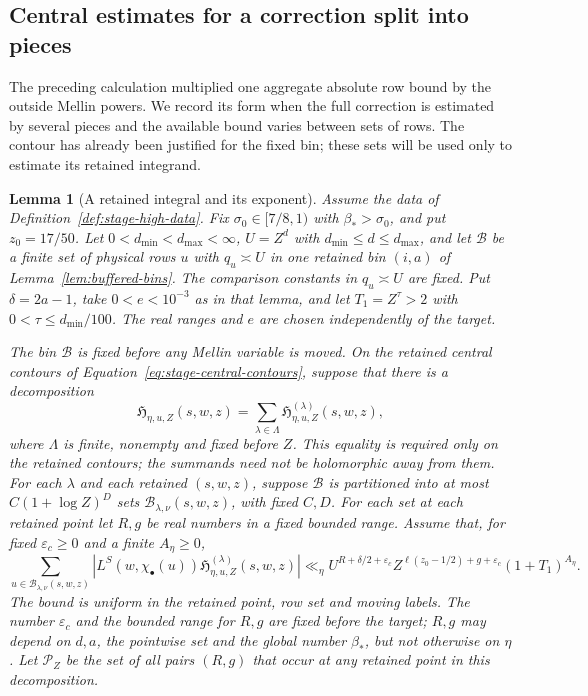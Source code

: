 \documentclass[11pt,a4paper]{article}
\numberwithin{equation}{section}
\numberwithin{figure}{section}
\newtheorem{lemma}[theorem]{Lemma}
\theoremstyle{definition}
\theoremstyle{remark}
\begin{document}
\subsection{Central estimates for a correction split into pieces}

The preceding calculation multiplied one aggregate absolute row bound by
the outside Mellin powers.  We record its form when the full correction is
estimated by several pieces and the available bound varies between sets of
rows.  The contour has already been justified for the fixed bin; these sets
will be used only to estimate its retained integrand.

\begin{lemma}[A retained integral and its exponent]
\label{lem:bin-contour-accounting}
Assume the data of Definition~\ref{def:stage-high-data}.  Fix
$\sigma_0\in[7/8,1)$ with $\beta_*>\sigma_0$, and put $z_0=17/50$.
Let $0<d_{\min}<d_{\max}<\infty$, $U=Z^d$ with
$d_{\min}\le d\le d_{\max}$, and let $\mathcal B$ be a finite set of
physical rows $u$ with $q_u\asymp U$ in one retained bin $(i,a)$ of
Lemma~\ref{lem:buffered-bins}.  The comparison constants in $q_u\asymp U$
are fixed.  Put $\delta=2a-1$, take $0<e<10^{-3}$ as in that lemma, and
let $T_1=Z^\tau>2$ with $0<\tau\le d_{\min}/100$.
The real ranges and $e$ are chosen independently of the target.

The bin $\mathcal B$ is fixed before any Mellin variable is moved.  On the retained central contours of
Equation~\eqref{eq:stage-central-contours}, suppose that there is a decomposition
\[
 \mathfrak H_{\eta,u,Z}(s,w,z)
       =\sum_{\lambda\in\Lambda}
             \mathfrak H^{(\lambda)}_{\eta,u,Z}(s,w,z),
\]
where $\Lambda$ is finite, nonempty and fixed before $Z$.  This equality is required
only on the retained contours; the summands need not be holomorphic away
from them.  For each $\lambda$ and each retained $(s,w,z)$, suppose
$\mathcal B$ is partitioned into at most $C(1+\log Z)^D$ sets
$\mathcal B_{\lambda,\nu}(s,w,z)$, with fixed $C,D$.  For each set at each
retained point let $R,g$ be real numbers in a fixed bounded range.  Assume
that, for fixed
$\varepsilon_c\ge0$ and a finite $A_\eta\ge0$,
\begin{equation}
 \sum_{u\in\mathcal B_{\lambda,\nu}(s,w,z)}
  \left|L^S(w,\chi_\bullet(u))
       \mathfrak H^{(\lambda)}_{\eta,u,Z}(s,w,z)\right|
 \ll_\eta U^{R+\delta/2+\varepsilon_c}
 Z^{\ell(z_0-1/2)+g+\varepsilon_c}(1+T_1)^{A_\eta}.
 \label{eq:stage-central-bound}
\end{equation}
The bound is uniform in the retained point, row set and moving labels.
The number $\varepsilon_c$ and the bounded range for $R,g$ are fixed before
the target; $R,g$ may depend on $d,a$, the pointwise set and the global number
$\beta_*$, but not otherwise on $\eta$.  Let $\mathcal P_Z$ be the set of
all pairs $(R,g)$ that occur at any retained point in this decomposition.


\end{lemma}
\end{document}
